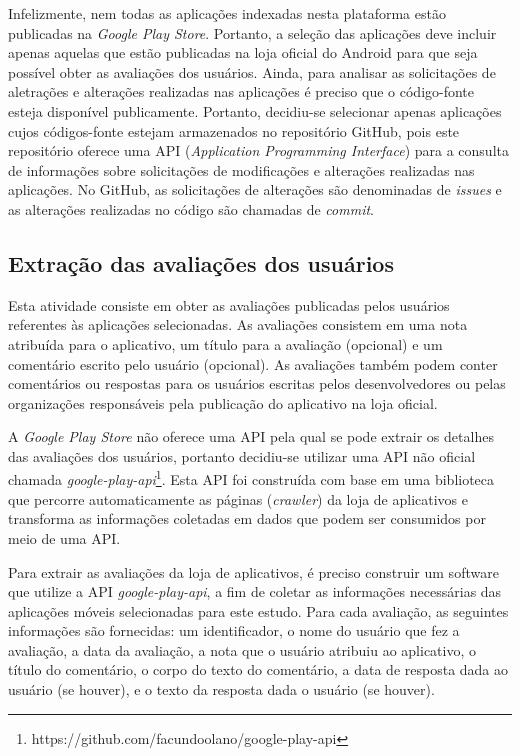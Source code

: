 Infelizmente, nem todas as aplicações indexadas nesta plataforma estão publicadas na \textit{Google Play Store}. Portanto, a seleção das aplicações deve incluir apenas aquelas que estão publicadas na loja oficial do Android para que seja possível obter as avaliações dos usuários. 
Ainda, para analisar as solicitações de aletrações e alterações realizadas nas aplicações é preciso que o código-fonte esteja disponível publicamente. Portanto, decidiu-se selecionar apenas aplicações cujos códigos-fonte estejam armazenados no repositório GitHub, pois este repositório oferece uma API (\textit{Application Programming Interface}) para a consulta de informações sobre solicitações de modificações e alterações realizadas nas aplicações. No GitHub, as solicitações de alterações são denominadas de \textit{issues} e as alterações realizadas no código são chamadas de \textit{commit}.


\subsection{Extração das avaliações dos usuários}
\label{sec:extracaoavaliacoes}

Esta atividade consiste em obter as avaliações publicadas pelos usuários referentes às aplicações selecionadas. As avaliações consistem em uma nota atribuída para o aplicativo, um título para a avaliação (opcional) e um comentário escrito pelo usuário (opcional). As avaliações também podem conter comentários ou respostas para os usuários escritas pelos desenvolvedores ou pelas organizações responsáveis pela publicação do aplicativo na loja oficial. 

A \textit{Google Play Store} não oferece uma API pela qual se pode extrair os detalhes das avaliações dos usuários, portanto decidiu-se utilizar uma API não oficial chamada \textit{google-play-api}\footnote{https://github.com/facundoolano/google-play-api}. Esta API foi construída com base em uma biblioteca que percorre automaticamente as páginas (\textit{crawler}) da loja de aplicativos e transforma as informações coletadas em dados que podem ser consumidos por meio de uma API.

Para extrair as avaliações da loja de aplicativos, é preciso construir um software que utilize a API \textit{google-play-api}, a fim de coletar as informações necessárias das aplicações móveis selecionadas para este estudo. 
Para cada avaliação, as seguintes informações são fornecidas: 
um identificador, o nome do usuário que fez a avaliação, a data da avaliação, a nota que o usuário atribuiu ao aplicativo, o título do comentário, o corpo do texto do comentário, a data de resposta dada ao usuário (se houver), e o texto da resposta dada o usuário (se houver).


